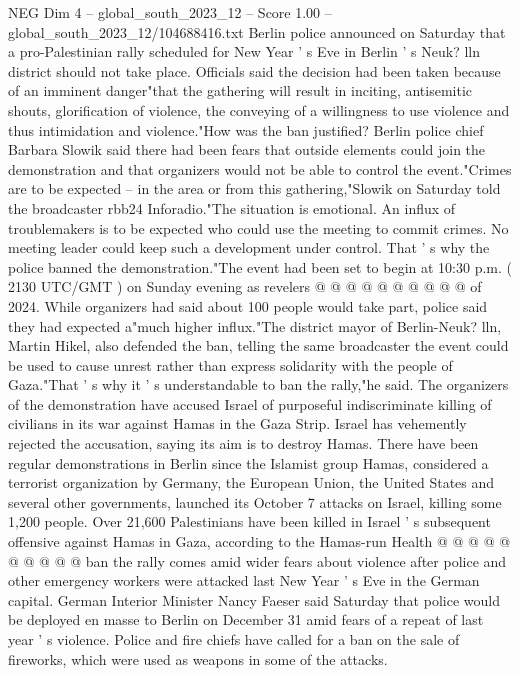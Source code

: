 \begin{textsample}{NEG Dim 4 – global\_south\_2023\_12 – Score 1.00 – global\_south\_2023\_12/104688416.txt}  \label{ex:f4_neg_321}
Berlin police announced on Saturday that a pro-Palestinian rally scheduled for New Year ' s Eve in Berlin ' s Neuk? lln district should not take place.
Officials said the decision had been taken because of an imminent danger"that the gathering will result in inciting, antisemitic shouts, glorification of violence, the conveying of a willingness to use violence and thus intimidation and violence."How was the ban justified?
Berlin police chief Barbara Slowik said there had been fears that outside elements could join the demonstration and that organizers would not be able to control the event."Crimes are to be expected -- in the area or from this gathering,"Slowik on Saturday told the broadcaster rbb24 Inforadio."The situation is emotional.
An influx of troublemakers is to be expected who could use the meeting to commit crimes.
No meeting leader could keep such a development under control.
That ' s why the police banned the demonstration."The event had been set to begin at 10:30 p.m. ( 2130 UTC/GMT ) on Sunday evening as revelers @ @ @ @ @ @ @ @ @ @ of 2024.
While organizers had said about 100 people would take part, police said they had expected a"much higher influx."The district mayor of Berlin-Neuk? lln, Martin Hikel, also defended the ban, telling the same broadcaster the event could be used to cause unrest rather than express solidarity with the people of Gaza."That ' s why it ' s understandable to ban the rally,"he said.
The organizers of the demonstration have accused Israel of purposeful indiscriminate killing of civilians in its war against Hamas in the Gaza Strip.
Israel has vehemently rejected the accusation, saying its aim is to destroy Hamas.
There have been regular demonstrations in Berlin since the Islamist group Hamas, considered a terrorist organization by Germany, the European Union, the United States and several other governments, launched its October 7 attacks on Israel, killing some 1,200 people.
Over 21,600 Palestinians have been killed in Israel ' s subsequent offensive against Hamas in Gaza, according to the Hamas-run Health @ @ @ @ @ @ @ @ @ @ ban the rally comes amid wider fears about violence after police and other emergency workers were attacked last New Year ' s Eve in the German capital.
German Interior Minister Nancy Faeser said Saturday that police would be deployed en masse to Berlin on December 31 amid fears of a repeat of last year ' s violence.
Police and fire chiefs have called for a ban on the sale of fireworks, which were used as weapons in some of the attacks.

\end{textsample}
